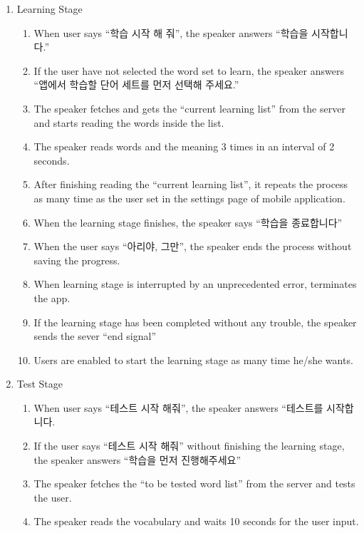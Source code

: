 \documentclass[conference]{IEEEtran}
\begin{document}
\begin{enumerate}
    \item Learning Stage
    \begin{enumerate}
        \item When user says “학습 시작 해 줘”, the speaker answers “학습을 시작합니다.”
        \item If the user have not selected the word set to learn, the speaker answers “앱에서 학습할 단어 세트를 먼저 선택해 주세요.”
        \item The speaker fetches and gets the “current learning list” from the server and starts reading the words inside the list.
        \item The speaker reads words and the meaning 3 times in an interval of 2 seconds.
        \item After finishing reading the “current learning list”, it repeats the process as many time as the user set in the settings page of mobile application. 
        \item When the learning stage finishes, the speaker says “학습을 종료합니다”
        \item When the user says “아리야, 그만”, the speaker ends the process without saving the progress.
        \item When learning stage is interrupted by an unprecedented error, terminates the app.
        \item If the learning stage has been completed without any trouble, the speaker sends the sever “end signal”
        \item Users are enabled to start the learning stage as many time he/she wants.
    \end{enumerate}
    \item Test Stage
    \begin{enumerate}
        \item When user says “테스트 시작 해줘”, the speaker answers “테스트를 시작합니다.
        \item If the user says “테스트 시작 해줘” without finishing the learning stage, the speaker answers “학습을 먼저 진행해주세요”
        \item The speaker fetches the “to be tested word list” from the server and tests the user.
        \item The speaker reads the vocabulary and waits 10 seconds for the user input.

\end{enumerate}
\end{enumerate}
\end{document}
